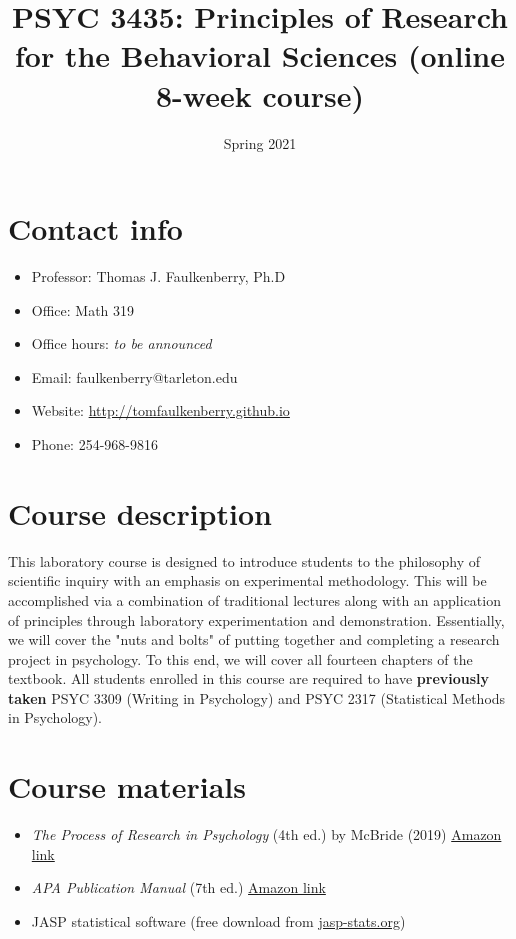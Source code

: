 \documentclass[10pt]{article}
\date{Spring 2021}
\title{PSYC 3435: Principles of Research for the Behavioral Sciences (online 8-week course)}
\begin{document}
\maketitle

\section*{Contact info}
\label{sec:org823d8a4}
\begin{itemize}
\item Professor: Thomas J. Faulkenberry, Ph.D
\item Office: Math 319
\item Office hours: \emph{to be announced}
\item Email: faulkenberry@tarleton.edu
\item Website: \url{http://tomfaulkenberry.github.io}
\item Phone: 254-968-9816
\end{itemize}

\section*{Course description}
\label{sec:org3814107}

This laboratory course is designed to introduce students to the philosophy of scientific inquiry with an emphasis on experimental methodology. This will be accomplished via a combination of traditional lectures along with an application of principles through laboratory experimentation and demonstration. Essentially, we will cover the "nuts and bolts" of putting together and completing a research project in psychology. To this end, we will cover all fourteen chapters of the textbook. All students enrolled in this course are required to have \textbf{previously taken} PSYC 3309 (Writing in Psychology) and PSYC 2317 (Statistical Methods in Psychology). 

\section*{Course materials}
\label{sec:orgbd8748b}

\begin{itemize}
\item \emph{The Process of Research in Psychology} (4th ed.) by McBride (2019) \href{https://www.amazon.com/Process-Research-Psychology-Dawn-McBride/dp/1544323492}{Amazon link}
\item \emph{APA Publication Manual} (7th ed.) \href{https://www.amazon.com/Publication-Manual-American-Psychological-Association/dp/143383216X}{Amazon link}
\item JASP statistical software (free download from \href{http://jasp-stats.org}{jasp-stats.org})
\end{itemize}
\end{document}

